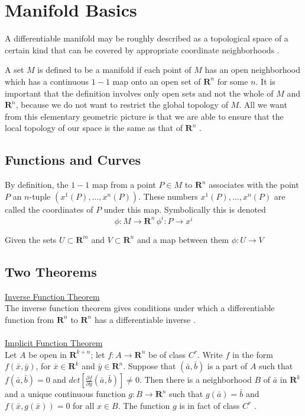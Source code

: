 \documentclass[twocolumn]{article}
\begin{document}
\section{Manifold Basics}\label{S:mani_bas}

A differentiable manifold may be roughly described as a topological 
space of a certain kind that can be covered by appropriate coordinate 
neighborhoods 
\cite{love_rund}.

A set $M$ is defined to be a manifold if each point of $M$ has an open 
neighborhood which has a continuous $1-1$ map onto an open set of 
$\mathbf{R}^n$ for some $n$.  It is important that the definition 
involves only open sets and not the whole of $M$ and $\mathbf{R}^n$, 
because we do not want to restrict the global topology of $M$.  All we 
want from this elementary geometric picture is that we are able to 
ensure that the local topology of our space is the same as that of 
$\mathbf{R}^n$ \cite{schutz}.  

\subsection{Functions and Curves}\label{SS:F_and_C}

By definition, the $1-1$ map from a point $P \in M$ to $\mathbf{R}^n$
associates with the point $P$ an $n$-tuple $\left(x^1(P), \ldots, 
x^n(P) 
\right)$.  These numbers $x^1(P), \ldots, x^n(P)$ are called the 
coordinates of $P$ under this map.  Symbolically this is denoted
\[
  \phi:M \rightarrow \mathbf{R}^n \, \phi^i:P \rightarrow x^i
\]  

Given the sets $U \subset \mathbf{R}^{m}$ and $V \subset 
\mathbf{R}^{n}$
and a map between them $\phi : U \rightarrow V$


\subsection{Two Theorems}\label{SS:two_theorems}

\noindent\underline{Inverse Function Theorem} \\
The inverse function theorem gives conditions under which a 
differentiable function from $\mathbf{R}^{n}$ to $\mathbf{R}^{n}$ has 
a differentiable inverse \cite{munkres}.   
\\\\
\noindent\underline{Implicit Function Theorem} \\
Let $A$ be open in $\mathbf{R}^{k+n}$; let $f:A \rightarrow 
\mathbf{R}^{n}$ be of class $C^{r}$.  Write $f$ in the form 
$f(\bar x, \bar y)$, for $\bar x \in \mathbf{R}^{k}$ and $\bar y \in 
\mathbf{R}^{n}$.  Suppose that $(\bar a, \bar b)$ is a part of $A$ 
such that $f(\bar a, \bar b) = 0$ and 
$det \left[ \frac{\partial f}{\partial \bar y}(\bar a, \bar b)\right]
\neq 0$.  Then there is a neighborhood $B$ of $\bar a$ in 
$\mathbf{R}^{k}$ and a unique continuous function $g:B \rightarrow 
\mathbf{R}^{n}$ such that $g(\bar a) = \bar b$ and $f\left(\bar x, 
g(\bar x)\right) = 0$ for all $x \in B$.  The function $g$ is in fact 
of class $C^{r}$ \cite{munkres}.
\end{document}
